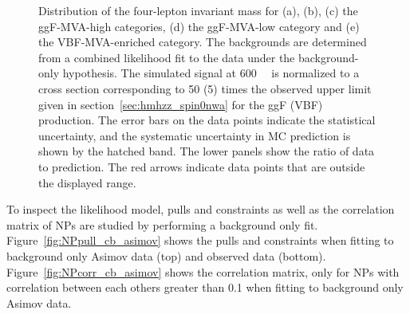 \begin{figure}[!ht]
\begin{center}
    \caption{Distribution of the four-lepton invariant mass \mfl  
        for (a), (b), (c) the ggF-MVA-high categories, (d) the ggF-MVA-low category 
        and (e) the VBF-MVA-enriched category. 
    The backgrounds are determined from a combined likelihood fit to the data under the background-only 
    hypothesis. The simulated signal at 600~\gev~ is normalized to 
    a cross section corresponding to 50 (5) times the observed upper limit given in section~\ref{sec:hmhzz_spin0nwa}
    for the ggF (VBF) production.
    The error bars on the data points indicate the statistical uncertainty, 
    and the systematic uncertainty in MC prediction is shown by the hatched band. 
    The lower panels show the ratio of data to prediction.
    The red arrows indicate data points that are outside the displayed range.}   
  \label{fig:m4l_postfit} 
  \end{center}
\end{figure}

To inspect the likelihood model, pulls and constraints as well as the correlation matrix of NPs are studied by performing a background only fit.
Figure~\ref{fig:NPpull_cb_asimov} shows the pulls and constraints when fitting to background only Asimov data (top) and observed data (bottom).
Figure~\ref{fig:NPcorr_cb_asimov} shows the correlation matrix, only for NPs with correlation between each others greater than 0.1 when fitting to background only Asimov data.

